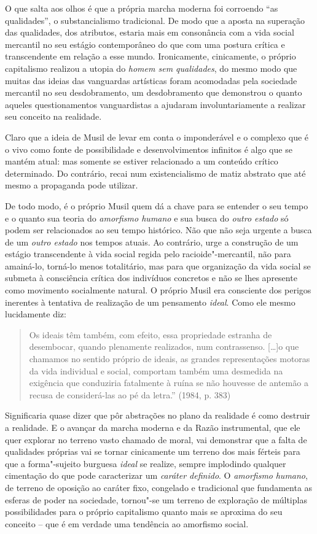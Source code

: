 O que salta aos olhos é que a própria marcha moderna foi corroendo ``as
qualidades'', o substancialismo tradicional. De modo que a aposta na
superação das qualidades, dos atributos, estaria mais em consonância com
a vida social mercantil no seu estágio contemporâneo do que com uma
postura crítica e transcendente em relação a esse mundo. Ironicamente,
cinicamente, o próprio capitalismo realizou a utopia do \emph{homem sem
qualidades}, do mesmo modo que muitas das ideias das vanguardas
artísticas foram acomodadas pela sociedade mercantil no seu
desdobramento, um desdobramento que demonstrou o quanto aqueles
questionamentos vanguardistas a ajudaram involuntariamente a realizar
seu conceito na realidade.

Claro que a ideia de Musil de levar em conta o imponderável e o complexo
que é o vivo como fonte de possibilidade e desenvolvimentos infinitos é
algo que se mantém atual: mas somente se estiver relacionado a um
conteúdo crítico determinado. Do contrário, recai num existencialismo de
matiz abstrato que até mesmo a propaganda pode utilizar.

De todo modo, é o próprio Musil quem dá a chave para se entender o seu
tempo e o quanto sua teoria do \emph{amorfismo humano} e sua busca do
\emph{outro estado} só podem ser relacionados ao seu tempo histórico.
Não que não seja urgente a busca de um \emph{outro estado} nos tempos
atuais. Ao contrário, urge a construção de um estágio transcendente à
vida social regida pelo racioide"-mercantil, não para amainá-lo, torná-lo
menos totalitário, mas para que organização da vida social se submeta à
consciência crítica dos indivíduos concretos e não se lhes apresente
como movimento socialmente natural. O próprio Musil era consciente dos
perigos inerentes à tentativa de realização de um pensamento
\emph{ideal}. Como ele mesmo lucidamente diz:

\begin{quote}
Os ideais têm também, com efeito, essa propriedade estranha de
desembocar, quando plenamente realizados, num contrassenso. [\ldots{}]o
que chamamos no sentido próprio de ideais, as grandes representações
motoras da vida individual e social, comportam também uma desmedida na
exigência que conduziria fatalmente à ruína se não houvesse de antemão a
recusa de considerá-las ao pé da letra.'' (1984, p. 383)
\end{quote}

Significaria quase dizer que pôr abstrações no plano da realidade é como
destruir a realidade. E o avançar da marcha moderna e da Razão
instrumental, que ele quer explorar no terreno vasto chamado de moral,
vai demonstrar que a falta de qualidades próprias vai se tornar
cinicamente um terreno dos mais férteis para que a forma"-sujeito
burguesa \emph{ideal} se realize, sempre implodindo qualquer cimentação
do que pode caracterizar um \emph{caráter definido}. O \emph{amorfismo}
\emph{humano}, de terreno de oposição ao caráter fixo, congelado e
tradicional que fundamenta as esferas de poder na sociedade, tornou"-se
um terreno de exploração de múltiplas possibilidades para o próprio
capitalismo quanto mais se aproxima do seu conceito -- que é em verdade
uma tendência ao amorfismo social.


